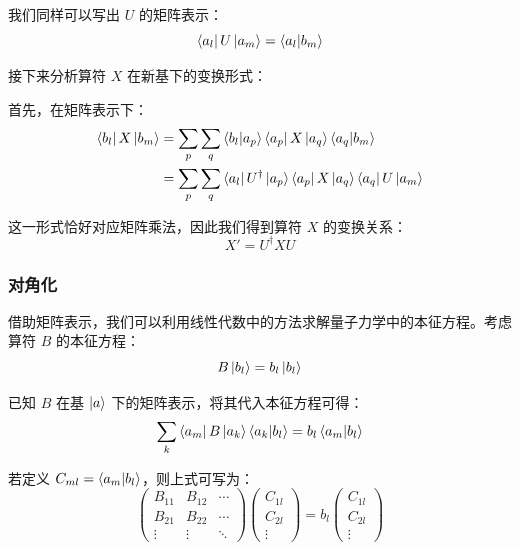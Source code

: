 我们同样可以写出 $U$ 的矩阵表示：
\begin{equation}
	\bra{a_{l}} U \ket{a_{m}} = \braket{a_{l}}{b_{m}}
\end{equation}

接下来分析算符 $X$ 在新基下的变换形式：

首先，在矩阵表示下：
\begin{align}
	\bra{b_{l}} X \ket{b_{m}} &= \sum_{p} \sum_{q} \braket{b_{l}}{a_{p}} \bra{a_{p}} X \ket{a_{q}} \braket{a_{q}}{b_{m}} \\
	&= \sum_{p} \sum_{q} \bra{a_{l}} U^{\dagger} \ket{a_{p}} \bra{a_{p}} X \ket{a_{q}} \bra{a_{q}} U \ket{a_{m}}
\end{align}

这一形式恰好对应矩阵乘法，因此我们得到算符 $X$ 的变换关系：
\begin{equation}
	X' = U^{\dagger} X U
\end{equation}

\subsubsection{对角化}

借助矩阵表示，我们可以利用线性代数中的方法求解量子力学中的本征方程。考虑算符 $B$ 的本征方程：
\begin{equation}
	B \ket{b_{l}} = b_{l} \ket{b_{l}}
\end{equation}

已知 $B$ 在基 $\ket{a}$ 下的矩阵表示，将其代入本征方程可得：
\begin{equation}
	\sum_{k} \bra{a_{m}} B \ket{a_{k}} \braket{a_{k}}{b_{l}} = b_{l} \braket{a_{m}}{b_{l}}
\end{equation}

若定义 $C_{m l} = \braket{a_{m}}{b_{l}}$，则上式可写为：
\begin{equation}
	\begin{pmatrix}
		B_{11} & B_{12} & \cdots \\
		B_{21} & B_{22} & \cdots \\
		\vdots & \vdots & \ddots
	\end{pmatrix}
	\begin{pmatrix}
		C_{1 l} \\
		C_{2 l} \\
		\vdots
	\end{pmatrix}
	= b_{l}
	\begin{pmatrix}
		C_{1 l} \\
		C_{2 l} \\
		\vdots
	\end{pmatrix}
\end{equation}

